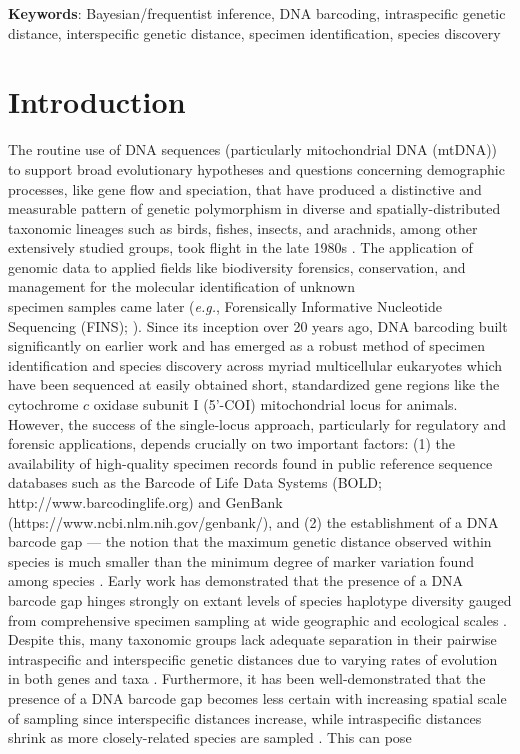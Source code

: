 \documentclass[12pt]{article}
\begin{document}
\textbf{Keywords}: Bayesian/frequentist inference, DNA barcoding, intraspecific genetic \\ distance, interspecific genetic distance, specimen identification, species discovery

\vspace{2mm}

\section{Introduction}

The routine use of DNA sequences (particularly mitochondrial DNA (mtDNA)) to support broad evolutionary hypotheses and questions concerning demographic processes, like gene flow and speciation, that have produced a distinctive and measurable pattern of genetic polymorphism in diverse and spatially-distributed taxonomic lineages such as birds, fishes, insects, and arachnids, among other extensively studied groups, took flight in the late 1980s \citep{avise1987intraspecific}. The application of genomic data to applied fields like biodiversity forensics, conservation, and management for the molecular identification of unknown \\ specimen samples came later (\textit{e.g.}, Forensically Informative Nucleotide Sequencing (FINS); \citet{bartlett1992fins}). Since its inception over 20 years ago, DNA barcoding \citep{hebert2003biological, hebert2003barcoding} built significantly on earlier work and has emerged as a robust method of specimen identification and species discovery across myriad multicellular eukaryotes which have been sequenced at easily obtained short, standardized gene regions like the cytochrome $c$ oxidase subunit I (5'-COI) mitochondrial locus for animals. However, the success of the single-locus approach, particularly for regulatory and forensic applications, depends crucially on two important factors: (1) the availability of high-quality specimen records found in public reference sequence databases such as the Barcode of Life Data Systems (BOLD;  \\ http://www.barcodinglife.org) \citep{ratnasingham2007bold} and GenBank \\ (https://www.ncbi.nlm.nih.gov/genbank/), and (2) the establishment of a DNA barcode gap --- the notion that the maximum genetic distance observed within species is much smaller than the minimum degree of marker variation found among species \citep{meyer2005dna, meier2008use}. Early work has demonstrated that the presence of a DNA barcode gap hinges strongly on extant levels of species haplotype diversity gauged from comprehensive specimen sampling at wide geographic and ecological scales \citep{bergsten2012effect, candek2015dna}. Despite this, many taxonomic groups lack adequate separation in their pairwise intraspecific and interspecific genetic distances due to varying rates of evolution in both genes and taxa \citep{pentinsaari2016molecular}. Furthermore, it has been well-demonstrated that the presence of a DNA barcode gap becomes less certain with increasing spatial scale of sampling since interspecific distances increase, while intraspecific distances shrink as more closely-related species are sampled \citep{phillips2022lack}. This can pose 
\end{document}
